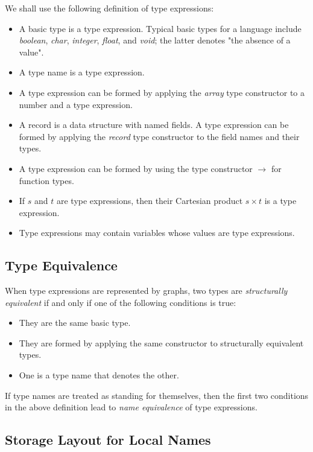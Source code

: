 \documentclass[12pt,a4paper,twoside,openany]{book}
\begin{document}
We shall use the following definition of type expressions:
\begin{itemize}
    \item A basic type is a type expression. Typical basic types for a language include \textit{boolean}, \textit{char}, \textit{integer}, \textit{float}, and \textit{void}; the latter denotes "the absence of a value".
    \item A type name is a type expression.
    \item A type expression can be formed by applying the \textit{array} type constructor to a number and a type expression.
    \item A record is a data structure with named fields. A type expression can be formed by applying the \textit{record} type constructor to the field names and their types.
    \item A type expression can be formed by using the type constructor $\rightarrow$ for function types.
    \item If $s$ and $t$ are type expressions, then their Cartesian product $s\times t$ is a type expression.
    \item Type expressions may contain variables whose values are type expressions.
\end{itemize}

\subsection{Type Equivalence}

When type expressions are represented by graphs, two types are \textit{structurally equivalent} if and only if one of the following conditions is true:
\begin{itemize}
    \item They are the same basic type.
    \item They are formed by applying the same constructor to structurally equivalent types.
    \item One is a type name that denotes the other.
\end{itemize}
If type names are treated as standing for themselves, then the first two conditions in the above definition lead to \textit{name equivalence} of type expressions.

\subsection{Storage Layout for Local Names}
\end{document}
